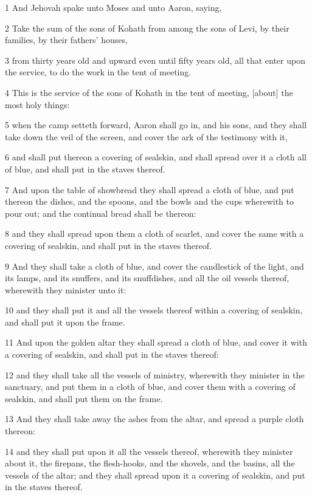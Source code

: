 \par 1 And Jehovah spake unto Moses and unto Aaron, saying,
\par 2 Take the sum of the sons of Kohath from among the sons of Levi, by their families, by their fathers' houses,
\par 3 from thirty years old and upward even until fifty years old, all that enter upon the service, to do the work in the tent of meeting.
\par 4 This is the service of the sons of Kohath in the tent of meeting, [about] the most holy things:
\par 5 when the camp setteth forward, Aaron shall go in, and his sons, and they shall take down the veil of the screen, and cover the ark of the testimony with it,
\par 6 and shall put thereon a covering of sealskin, and shall spread over it a cloth all of blue, and shall put in the staves thereof.
\par 7 And upon the table of showbread they shall spread a cloth of blue, and put thereon the dishes, and the spoons, and the bowls and the cups wherewith to pour out; and the continual bread shall be thereon:
\par 8 and they shall spread upon them a cloth of scarlet, and cover the same with a covering of sealskin, and shall put in the staves thereof.
\par 9 And they shall take a cloth of blue, and cover the candlestick of the light, and its lamps, and its snuffers, and its snuffdishes, and all the oil vessels thereof, wherewith they minister unto it:
\par 10 and they shall put it and all the vessels thereof within a covering of sealskin, and shall put it upon the frame.
\par 11 And upon the golden altar they shall spread a cloth of blue, and cover it with a covering of sealskin, and shall put in the staves thereof:
\par 12 and they shall take all the vessels of ministry, wherewith they minister in the sanctuary, and put them in a cloth of blue, and cover them with a covering of sealskin, and shall put them on the frame.
\par 13 And they shall take away the ashes from the altar, and spread a purple cloth thereon:
\par 14 and they shall put upon it all the vessels thereof, wherewith they minister about it, the firepans, the flesh-hooks, and the shovels, and the basins, all the vessels of the altar; and they shall spread upon it a covering of sealskin, and put in the staves thereof.
